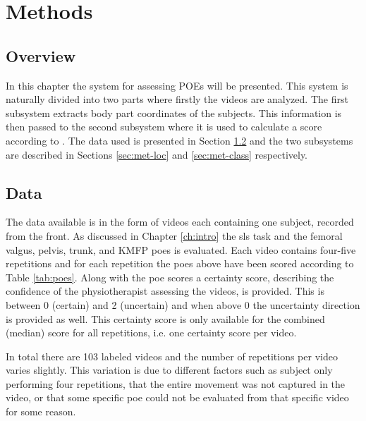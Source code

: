 \chapter{Methods} \label{ch:method}
\section{Overview}
In this chapter the system for assessing POEs will be presented. This system is naturally divided into two parts where firstly the videos are analyzed. The first subsystem extracts body part coordinates of the subjects. This information is then passed to the second subsystem where it is used to calculate a score according to \cite{Nae2017}. The data used is presented in Section \ref{sec:met-data} and the two subsystems are described in Sections \ref{sec:met-loc} and \ref{sec:met-class} respectively.

\section{Data}\label{sec:met-data}
The data available is in the form of videos each containing one subject, recorded from the front. As discussed in Chapter \ref{ch:intro} the \gls{sls} task and the femoral valgus, pelvis, trunk, and KMFP \glspl{poe} is evaluated. Each video contains four-five repetitions and for each repetition the \glspl{poe} above have been scored according to Table \ref{tab:poes}. Along with the \gls{poe} scores a certainty score, describing the confidence of the physiotherapist assessing the videos, is provided. This is between 0 (certain) and 2 (uncertain) and when above 0 the uncertainty direction is provided as well. This certainty score is only available for the combined (median) score for all repetitions, i.e. one certainty score per video.

In total there are 103 labeled videos and the number of repetitions per video varies slightly. This variation is due to different factors such as subject only performing four repetitions, that the entire movement was not captured in the video, or that some specific \gls{poe} could not be evaluated from that specific video for some reason.

